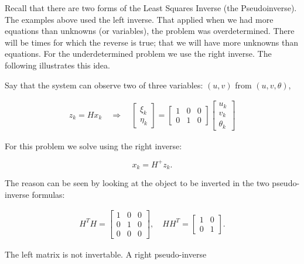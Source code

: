 Recall that there are two forms of the Least Squares Inverse (the
Pseudoinverse). The examples above used the left inverse. That applied
when we had more equations than unknowns (or variables), the problem was
overdetermined. There will be times for which the reverse is true; that
we will have more unknowns than equations. For the underdetermined
problem we use the right inverse. The following illustrates this idea.

Say that the system can observe two of three variables: \((u,v)\) from
\((u,v,\theta)\),

\[\begin{aligned}
z_k = Hx_k \quad \Rightarrow \quad \begin{bmatrix} \xi_k \\ \eta_k \end{bmatrix}
=
\begin{bmatrix}
 1 & 0 & 0 \\
0 & 1 & 0
\end{bmatrix}
\begin{bmatrix}
 u_k \\ v_k \\ \theta_k
\end{bmatrix}
\end{aligned}\]

For this problem we solve using the right inverse:

\[x_k = H^+ z_k .\]

The reason can be seen by looking at the object to be inverted in the
two pseudo-inverse formulas:

\[\begin{aligned}
H^TH = \begin{bmatrix}
 1 & 0 & 0 \\
0 & 1 & 0 \\
0 & 0 & 0
\end{bmatrix} ,
\quad
HH^T = \begin{bmatrix}
 1 & 0  \\
0 & 1
\end{bmatrix}.
\end{aligned}\]

The left matrix is not invertable. A right pseudo-inverse

